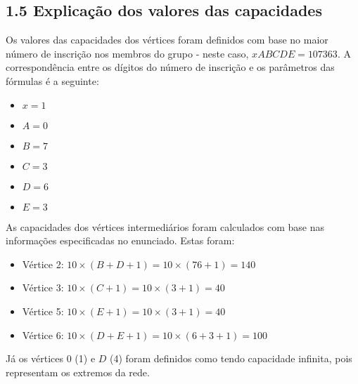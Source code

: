 \documentclass[a4paper,12pt]{article}
\begin{document}
\subsection*{1.5 Explicação dos valores das capacidades}
Os valores das capacidades dos vértices foram definidos com base no maior número de inscrição nos membros do grupo - neste caso, $xABCDE = 107363$. A correspondência entre os dígitos do número de inscrição e os parâmetros das fórmulas é a seguinte:
\begin{itemize}
    \item $x = 1$
    \item $A = 0$
    \item $B = 7$
    \item $C = 3$
    \item $D = 6$
    \item $E = 3$
\end{itemize}
As capacidades dos vértices intermediários foram calculados com base nas informações especificadas no enunciado. Estas foram:
\begin{itemize}
    \item Vértice 2: $10 \times (B + D + 1) = 10 \times (7  6 + 1) = 140$
    \item Vértice 3: $10 \times (C + 1) = 10 \times (3 + 1) = 40$
    \item Vértice 5: $10 \times (E + 1) = 10 \times (3 + 1) = 40$
    \item Vértice 6: $10 \times (D + E + 1) = 10 \times (6 + 3 + 1) = 100$
\end{itemize}
Já os vértices $0$ (1) e $D$ (4) foram definidos como tendo capacidade infinita, pois representam os extremos da rede.
\end{document}
